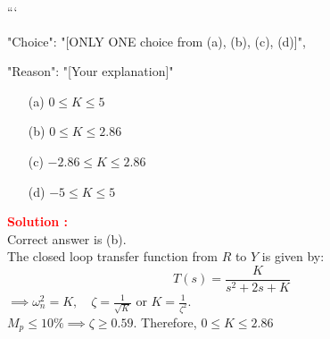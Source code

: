 \documentclass[12pt]{article}
\begin{document}
```
{

"Choice": "[ONLY ONE choice from (a), (b), (c), (d)]",

"Reason": "[Your explanation]"

}

\begin{itemize}
    \item[(a)] \(0 \leq  K \leq 5\)
    \item[(b)] \(0 \leq  K \leq 2.86\)
    \item[(c)] \(-2.86 \leq  K \leq 2.86\)
    \item[(d)] \(-5 \leq  K \leq 5\)
\end{itemize}


\textbf{\textcolor{red}{Solution :}} \\
Correct answer is (b).\\
\noindent The closed loop transfer function from $R$ to $Y$ is given by:
\[
T(s)=\frac{K}{s^2 + 2s + K}
\]
$\implies \omega_n^2=K, \quad \zeta=\frac{1}{\sqrt{K}} $ or $K=\frac{1}{\zeta^2}$.\\
$M_p \leq 10\% \implies \zeta \geq 0.59$. Therefore, $0 \leq  K \leq 2.86$
\clearpage
\end{document}
